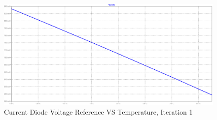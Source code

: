 \documentclass[conference]{IEEEtran}
\begin{document}
\begin{figure}[!htbp]
  	\centering
  	\includegraphics[scale=0.35]{images/cm-diode-vref-1.png}
  	\caption[cm-diode-vref-1]{Current Diode Voltage Reference VS Temperature, Iteration 1}
  	\label{fig:cm-diode-vref-1}
	\end{figure}
\end{document}
